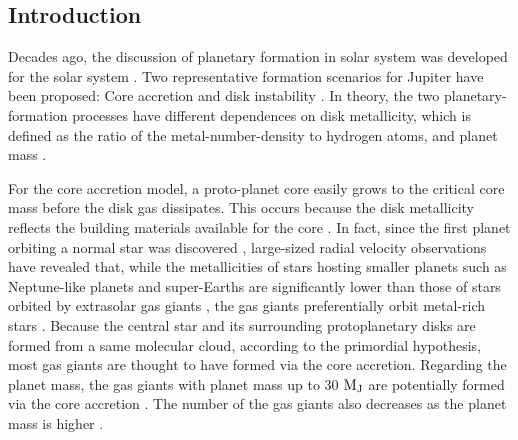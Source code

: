 \documentclass[twocolumn, dvipdfmx]{aastex62}
\begin{document}
\begin{CJK*}{UTF8}{min}
\begin{abstract}
\end{abstract}

\vspace{1cm}



\section{Introduction} \label{sec:introduction}

Decades ago, the discussion of planetary formation in solar system was developed for the solar system \citep{1985prpl.conf.1100H}. Two representative formation scenarios for Jupiter have been proposed: Core accretion \citep{1974Icar...22..416P, 1980PThPh..64..544M, 1996Icar..124...62P} and disk instability \citep{1951PNAS...37....1K, 1997Sci...276.1836B, 2002Sci...298.1756M}. In theory, the two planetary-formation processes have different dependences on disk metallicity, which is defined as the ratio of the metal-number-density to hydrogen atoms, and planet mass \citep[e.g.,][]{2007ApJ...662.1282M}.

For the core accretion model, a proto-planet core easily grows to the critical core mass before the disk gas dissipates. This occurs because the disk metallicity reflects the building materials available for the core \citep{2004ApJ...616..567I, 2012A&A...541A..97M}. In fact, since the first planet orbiting a normal star was discovered \citep{1995Natur.378..355M}, large-sized radial velocity observations have revealed that, while the metallicities of stars hosting smaller planets such as Neptune-like planets and super-Earths are significantly lower than those of stars orbited by extrasolar gas giants \citep{2011arXiv1109.2497M, 2015AJ....149...14W}, the gas giants preferentially orbit metal-rich stars \citep[e.g.,][]{2003A&A...398..363S, 2005ApJ...622.1102F}. Because the central star and its surrounding protoplanetary disks are formed from a same molecular cloud, according to the primordial hypothesis, most gas giants are thought to have formed via the core accretion. Regarding the planet mass, the gas giants with planet mass up to 30 $\rm M_J$ are potentially formed via the core accretion \citep[e.g.,][]{2007ApJ...667..557T, 2016ApJ...823...48T}. The number of the gas giants also decreases as the planet mass is higher \citep[e.g.,][]{2009A&A...501.1161M}.


\end{CJK*}
\end{document}
